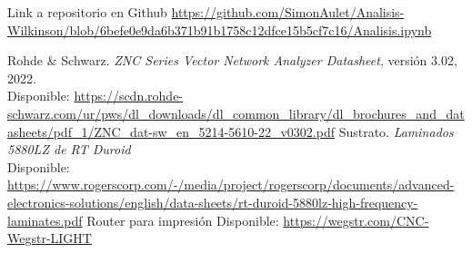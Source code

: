 \documentclass[a4paper, 12pt]{article}
\begin{document}
Link a repositorio en Github \url{https://github.com/SimonAulet/Analisis-Wilkinson/blob/6befe0e9da6b371b91b1758c12dfce15b5cf7c16/Analisis.ipynb}

\begin{thebibliography}{9} %
Rohde \& Schwarz. \textit{ZNC Series Vector Network Analyzer Datasheet},
versión 3.02, 2022. \\
Disponible: \url{https://scdn.rohde-schwarz.com/ur/pws/dl_downloads/dl_common_library/dl_brochures_and_datasheets/pdf_1/ZNC_dat-sw_en_5214-5610-22_v0302.pdf}
Sustrato. \textit{Laminados 5880LZ de RT Duroid}\\
Disponible: \url{https://www.rogerscorp.com/-/media/project/rogerscorp/documents/advanced-electronics-solutions/english/data-sheets/rt-duroid-5880lz-high-frequency-laminates.pdf}
Router para impresión
Disponible: \url{https://wegstr.com/CNC-Wegstr-LIGHT}
\end{thebibliography}
\end{document}
